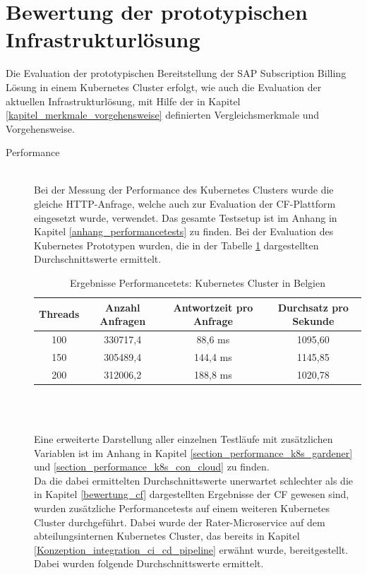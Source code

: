 \section{Bewertung der prototypischen Infrastrukturlösung}
\label{bewertung_k8s_prototyp}
Die Evaluation der prototypischen Bereitstellung der SAP Subscription Billing Lösung in einem Kubernetes Cluster erfolgt, wie auch die Evaluation der aktuellen Infrastrukturlösung, mit Hilfe der in Kapitel \ref{kapitel_merkmale_vorgehensweise} definierten Vergleichsmerkmale und Vorgehensweise.
\begin{description}
\item[Performance] \hfill \\
	Bei der Messung der Performance des Kubernetes Clusters wurde die gleiche \ac{HTTP}-Anfrage, welche auch zur Evaluation der \ac{CF}-Plattform eingesetzt wurde, verwendet. Das gesamte Testsetup ist im Anhang in Kapitel \ref{anhang_performancetests} zu finden. Bei der Evaluation des Kubernetes Prototypen wurden, die in der Tabelle \ref{tabelle_performance_k8s} dargestellten Durchschnittswerte ermittelt.
	\begin{table}[ht]
		\centering
		\begin{tabular}[h]{c|c|c|c}
			Threads & Anzahl Anfragen & Antwortzeit pro Anfrage & Durchsatz pro Sekunde \\
			\hline
			100 & 330717,4 & 88,6 ms & 1095,60 
			\\
			\hline
			150 & 305489,4 & 144,4 ms & 1145,85
			\\
			\hline
			200 & 312006,2 & 188,8 ms & 1020,78
			\\
		\end{tabular}\\
	\caption{Ergebnisse Performancetets: Kubernetes Cluster in Belgien}
	\label{tabelle_performance_k8s}
	\end{table}
	\\
	Eine erweiterte Darstellung aller einzelnen Testläufe mit zusätzlichen Variablen ist im Anhang in Kapitel \ref{section_performance_k8s_gardener} und \ref{section_performance_k8s_con_cloud} zu finden.\\
	Da die dabei ermittelten Durchschnittswerte unerwartet schlechter als die in Kapitel \ref{bewertung_cf} dargestellten Ergebnisse der \ac{CF} gewesen sind, wurden zusätzliche Performancetests auf einem weiteren Kubernetes Cluster durchgeführt. Dabei wurde der Rater-Microservice auf dem abteilungsinternen Kubernetes Cluster, das bereits in Kapitel \ref{Konzeption_integration_ci_cd_pipeline} erwähnt wurde, bereitgestellt. Dabei wurden folgende Durchschnittswerte ermittelt.

\end{description}
